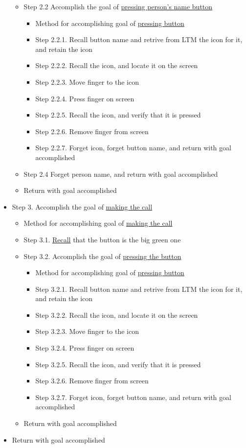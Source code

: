 \documentclass{article}
\begin{document}
\begin{itemize}
\begin{itemize}
    			\item Step 2.2 Accomplish the goal of \uline{pressing person's name button}
    			\begin{itemize}
					\item Method for accomplishing goal of \uline{pressing button}
					\item Step 2.2.1. Recall button name and retrive from LTM the icon for it, and retain the icon
					\item Step 2.2.2. Recall the icon, and locate it on the screen
					\item Step 2.2.3. Move finger to the icon
					\item Step 2.2.4. Press finger on screen
					\item Step 2.2.5. Recall the icon, and verify that it is pressed
					\item Step 2.2.6. Remove finger from screen
					\item Step 2.2.7. Forget icon, forget button name, and return with goal accomplished
				\end{itemize}
    			\item Step 2.4 Forget person name, and return with goal accomplished
    			\item Return with goal accomplished
		\end{itemize}
	\item Step 3. Accomplish the goal of \uline{making the call}
		\begin{itemize}
			\item Method for accomplishing goal of \uline{making the call}
			\item Step 3.1. \uline{Recall} that the button is the big green one
			\item Step 3.2. Accomplish the goal of \uline{pressing the button}
				\begin{itemize}
					\item Method for accomplishing goal of \uline{pressing button}
					\item Step 3.2.1. Recall button name and retrive from LTM the icon for it, and retain the icon
					\item Step 3.2.2. Recall the icon, and locate it on the screen
					\item Step 3.2.3. Move finger to the icon
					\item Step 3.2.4. Press finger on screen
					\item Step 3.2.5. Recall the icon, and verify that it is pressed
					\item Step 3.2.6. Remove finger from screen
					\item Step 3.2.7. Forget icon, forget button name, and return with goal accomplished
				\end{itemize}
    			\item Return with goal accomplished
		\end{itemize}
	\item Return with goal accomplished
\end{itemize}
\end{document}
